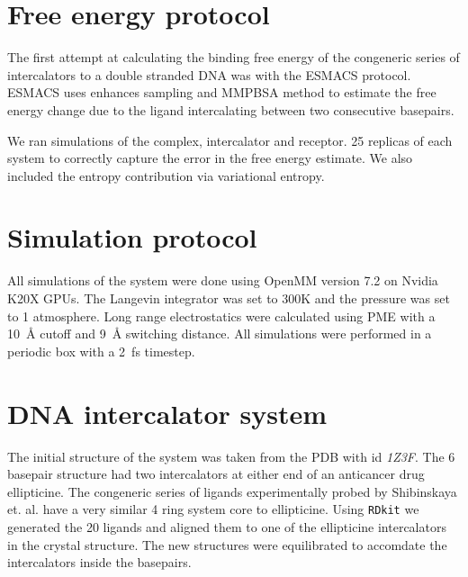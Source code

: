 \documentclass{article}
\begin{document}
  
\section{Free energy protocol}

The first attempt at calculating the binding free energy of the congeneric series of intercalators to a double stranded DNA was with the ESMACS protocol. ESMACS uses enhances sampling and MMPBSA method to estimate the free energy change due to the ligand intercalating between two consecutive basepairs.

We ran simulations of the complex, intercalator and receptor. 25 replicas of each system to correctly capture the error in the free energy estimate. We also included the entropy contribution via variational entropy. 

\section{Simulation protocol}

All simulations of the system were done using OpenMM version 7.2 on Nvidia K20X GPUs. The Langevin integrator was set to 300K and the pressure was set to 1 atmosphere. Long range electrostatics were calculated using PME with a \SI{10}{\angstrom} cutoff and \SI{9}{\angstrom} switching distance. All simulations were performed in a periodic box with a \SI{2}{\femto\second} timestep.

\section{DNA intercalator system}

The initial structure of the system was taken from the PDB with id \emph{1Z3F}. The 6 basepair structure had two intercalators at either end of an anticancer drug ellipticine. The congeneric series of ligands experimentally probed by Shibinskaya et. al. have a very similar 4 ring system core to ellipticine. Using \texttt{RDkit} we generated the 20 ligands and aligned them to one of the ellipticine intercalators in the crystal structure. The new structures were equilibrated to accomdate the intercalators inside the basepairs. 
  
\end{document}
